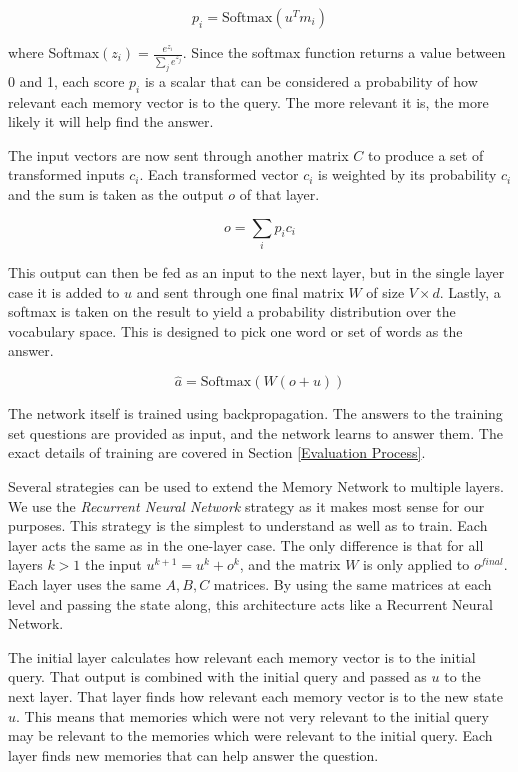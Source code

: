\documentclass[pageno]{final_paper}
\begin{document}
$$p_i = \text{Softmax}(u^Tm_i)$$

where Softmax$(z_i) = \frac{e^{z_i}}{\sum_j e^{z_j}}$. Since the softmax function
returns a value between 0 and 1, each score $p_i$ is a scalar that can be considered
a probability of how relevant each memory vector is to the query. The more relevant
it is, the more likely it will help find the answer.

The input vectors are now sent through another matrix $C$ to produce a set of
transformed inputs ${c_i}$. Each transformed vector $c_i$ is weighted by its
probability $c_i$ and the sum is taken as the output $o$ of that layer.

$$o = \sum_i p_i c_i$$

This output can then be fed as an input to the next layer, but in the single
layer case it is added to $u$ and sent through one final matrix $W$ of size
$V\times d$. Lastly, a softmax is taken on the result to yield a probability
distribution over the vocabulary space. This is designed to pick one word
or set of words as the answer.

$$\hat{a} = \text{Softmax}\left(W\left(o + u\right)\right)$$

The network itself is trained using backpropagation. The answers to the training
set questions are provided as input, and the network learns to answer them. The
exact details of training are covered in Section \ref{Evaluation Process}.

Several strategies can be used to extend the Memory Network to multiple layers.
We use the \textit{Recurrent Neural Network} strategy as it makes most sense for
our purposes. This strategy is the simplest to understand as well as to train.
Each layer acts the same as in the one-layer case. The only difference is that
for all layers $k > 1$ the input $u^{k+1} = u^k + o^k$, and the matrix $W$ is
only applied to $o^{final}$. Each layer uses the same $A,B,C$ matrices. By using
the same matrices at each level and passing the state along, this architecture
acts like a Recurrent Neural Network.

The initial layer calculates how relevant each memory vector is to the initial
query. That output is combined with the initial query and passed as $u$ to the
next layer. That layer finds how relevant each memory vector is to the new state
$u$. This means that memories which were not very relevant to the initial query
may be relevant to the memories which were relevant to the initial query. Each
layer finds new memories that can help answer the question. \\
\end{document}
